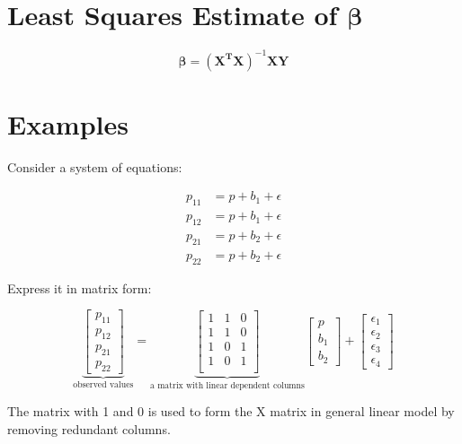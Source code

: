 \documentclass[12pt]{article}
\begin{document}
\section{Least Squares Estimate of $\boldsymbol{\beta}$}
\begin{equation*}
	\boldsymbol{\beta} = (\boldsymbol{X^T}\boldsymbol{X})^{-1}\boldsymbol{X}\boldsymbol{Y}
\end{equation*}

\section{Examples}
Consider a system of equations:

\begin{align*}
        p_{11} &= p + b_{1} + \epsilon \\
        p_{12} &= p + b_{1} + \epsilon \\
        p_{21} &= p + b_{2} + \epsilon \\
        p_{22} &= p + b_{2} + \epsilon
\end{align*}

Express it in matrix form:

\[
\underbrace{
\begin{bmatrix}
    p_{11} \\
    p_{12} \\
    p_{21} \\
    p_{22}
\end{bmatrix}
}_\text{observed values}
= 
\underbrace{
\begin{bmatrix}
    1 & 1 & 0 \\
    1 & 1 & 0 \\
    1 & 0 & 1 \\
    1 & 0 & 1 \\
\end{bmatrix} 
}_\text{a matrix with linear dependent columns}
\begin{bmatrix}
    p \\
    b_1 \\
    b_2
\end{bmatrix}
+ 
\begin{bmatrix}
    \epsilon_1 \\
    \epsilon_2 \\
    \epsilon_3 \\
    \epsilon_4
\end{bmatrix}
\]

The matrix with 1 and 0 is used to form the X matrix in general linear model by removing redundant columns. \\
\end{document}
